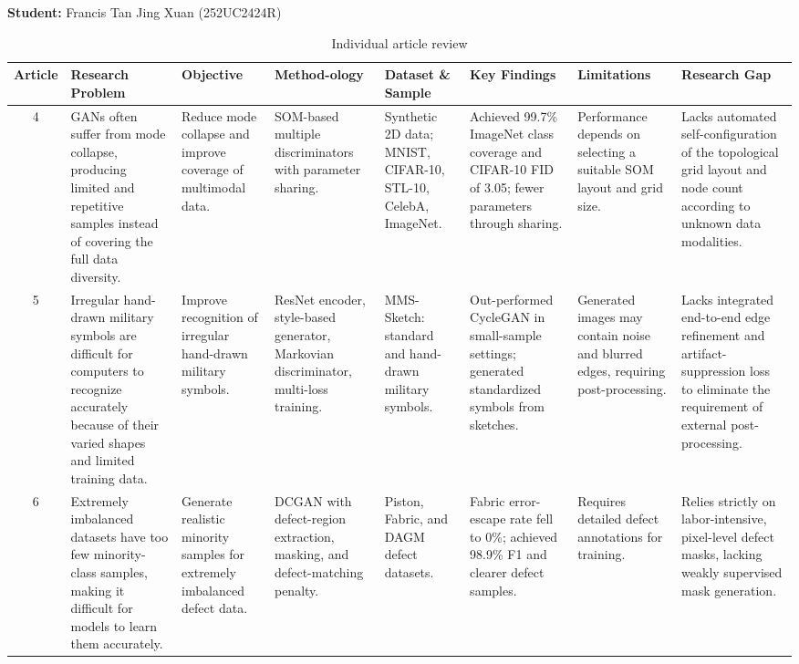 \documentclass[12pt,a4paper]{article}
\begin{document}
\newpage
\noindent \textbf{Student:} Francis Tan Jing Xuan (252UC2424R)


\begin{table}[H]

\caption{Individual article review}
\label{tab:individual-article-review}

\fontsize{10pt}{12pt}\selectfont

\begin{tabular}{|c|p{1.7cm}|p{2cm}|p{1.8cm}|p{1.5cm}|p{1.5cm}|p{2cm}|p{2cm}|}
\hline

\centering\textbf{Article} &
\centering\textbf{Research Problem} &
\centering\textbf{Objective} &
\centering\textbf{Method-ology} &
\centering\textbf{Dataset \& Sample} &
\centering\textbf{Key Findings} &
\centering\textbf{Limitations} &
\centering\textbf{Research Gap}
\tabularnewline
\hline

4 &  
GANs often suffer from mode collapse, producing limited and repetitive samples instead of covering the full data diversity. &
Reduce mode collapse and improve coverage of multimodal data. &
SOM-based multiple discriminators with parameter sharing. &
Synthetic 2D data; MNIST, CIFAR-10, STL-10, CelebA, ImageNet. &
Achieved 99.7\% ImageNet class coverage and CIFAR-10 FID of 3.05; fewer parameters through sharing. &
Performance depends on selecting a suitable SOM layout and grid size.& Lacks automated self-configuration of the topological grid layout and node count according to unknown data modalities.
\tabularnewline
\hline

5 &
Irregular hand-drawn military symbols are difficult for computers to recognize accurately because of their varied shapes and limited training data. &  
Improve recognition of irregular hand-drawn military symbols. &
ResNet encoder, style-based generator, Markovian discriminator, multi-loss training. &
MMS-Sketch: standard and hand-drawn military symbols. &
Out-performed CycleGAN in small-sample settings; generated standardized symbols from sketches. &
Generated images may contain noise and blurred edges, requiring post-processing.& Lacks integrated end-to-end edge refinement and artifact-suppression loss to eliminate the requirement of external post-processing.
\tabularnewline
\hline

6 &
Extremely imbalanced datasets have too few minority-class samples, making it difficult for models to learn them accurately. &
Generate realistic minority samples for extremely imbalanced defect data. &
DCGAN with defect-region extraction, masking, and defect-matching penalty. &
Piston, Fabric, and DAGM defect datasets. &
Fabric error-escape rate fell to 0\%; achieved 98.9\% F1 and clearer defect samples. &
Requires detailed defect annotations for training.& Relies strictly on labor-intensive, pixel-level defect masks, lacking weakly supervised mask generation.
\tabularnewline
\hline

\end{tabular}

\end{table}
\end{document}

